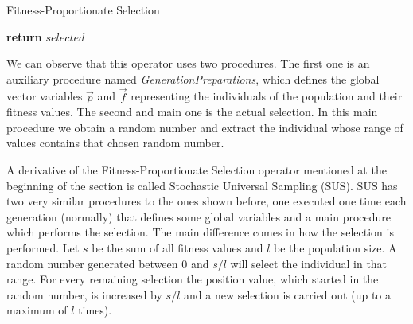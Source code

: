 \begin{algorithm}[H]
    \caption{Fitness-Proportionate Selection}
    \begin{algorithmic}[1]
             
             
            \EndIf
             
            \EndFor
        \EndProcedure
                \EndIf
            \EndFor
            \State \textbf{return} $selected$
        \EndProcedure
    \end{algorithmic}
\end{algorithm}

We can observe that this operator uses two procedures. The first one is an auxiliary procedure named \textit{GenerationPreparations}, which defines the global vector variables $\vec{p}$ and $\vec{f}$ representing the individuals of the population and their fitness values. The second and main one is the actual selection. In this main procedure we obtain a random number and extract the individual whose range of values contains that chosen random number.

A derivative of the Fitness-Proportionate Selection operator mentioned at the beginning of the section is called Stochastic Universal Sampling (SUS). SUS has two very similar procedures to the ones shown before, one executed one time each generation (normally) that defines some global variables and a main procedure which performs the selection. The main difference comes in how the selection is performed. Let $s$ be the sum of all fitness values and $l$ be the population size. A random number generated between $0$ and $s / l$ will select the individual in that range. For every remaining selection the position value, which started in the random number, is increased by $s / l$ and a new selection is carried out (up to a maximum of $l$ times).

